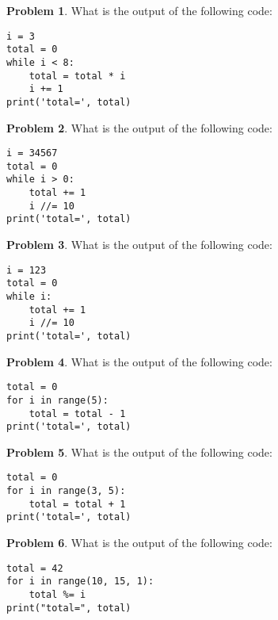 \documentclass[10pt]{article}
\theoremstyle{definition}
\newtheorem{problem}{Problem}
\begin{document}
\begin{problem}
    What is the output of the following code:
\end{problem}
\begin{lstlisting}
i = 3
total = 0
while i < 8:
    total = total * i
    i += 1
print('total=', total)
\end{lstlisting}
\vspace{0.1in}


\begin{problem}
    What is the output of the following code:
\end{problem}
\begin{lstlisting}
i = 34567
total = 0
while i > 0:
    total += 1
    i //= 10
print('total=', total)
\end{lstlisting}
\vspace{0.1in}


\begin{problem}
    What is the output of the following code:
\end{problem}
\begin{lstlisting}
i = 123
total = 0
while i:
    total += 1
    i //= 10
print('total=', total)
\end{lstlisting}
\vspace{0.1in}


\begin{problem}
    What is the output of the following code:
\end{problem}
\begin{lstlisting}
total = 0
for i in range(5):
    total = total - 1
print('total=', total)
\end{lstlisting}
\vspace{0.1in}

\begin{problem}
    What is the output of the following code:
\end{problem}
\begin{lstlisting}
total = 0
for i in range(3, 5):
    total = total + 1
print('total=', total)
\end{lstlisting}
\vspace{0.1in}



\begin{problem}
    What is the output of the following code:
\end{problem}
\begin{lstlisting}
total = 42
for i in range(10, 15, 1):
    total %= i
print("total=", total)
\end{lstlisting}
\vspace{0.1in}
\end{document}
